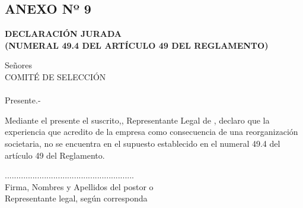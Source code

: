 \begin{center}
    \section*{ANEXO Nº 9 } 
    \textbf{DECLARACIÓN JURADA \\
    (NUMERAL 49.4 DEL ARTÍCULO 49 DEL REGLAMENTO)} 
    \end{center}
    
    Señores \\
    COMITÉ DE SELECCIÓN \\
    \nomenclatura \\
    Presente.-
    
    \vspace{0.5cm}
    
    Mediante el presente el suscrito,\representante, Representante Legal de \empresa, declaro que la experiencia que acredito de la empresa \empresa como consecuencia de una reorganización societaria, no se encuentra en el supuesto establecido en el numeral 49.4 del artículo 49 del Reglamento.   
    
    \vspace{0.5cm}
    
    \fecha 
    
    \vspace{2cm}
    
    \begin{center}
    ........................................................\\
    Firma, Nombres y Apellidos del postor o \\ 
    Representante legal, según corresponda
    
    \end{center}